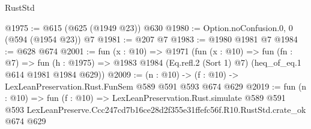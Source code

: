 \begin{lexlean}{RustStd}
\begin{coremodule}
@1975 := @615 (@625 (@1949 @23)) @630
@1980 := Option.noConfusion.{0, 0} (@594 (@1954 @23)) @7
@1981 := @207 @7
@1983 := @1980 @1981 @7
@1984 := @628 @674
@2001 := fun (x : @10) =>
  @1971
    (fun (x : @10) =>
    fun (fn : @7) =>
    fun (h : @1975) => @1983 @1984 (Eq.refl.{2} (Sort 1) @7) (heq_of_eq.{1} @614 @1981 @1984 @629))
@2009 := (n : @10) -> (f : @10) -> LexLeanPreservation.Rust.FunSem @589 @591 @593 @674 @629
@2019 := fun (n : @10) =>
  fun (f : @10) =>
  LexLeanPreservation.Rust.simulate
    @589
    @591
    @593
    LexLeanPreserve.Ccc247cd7b16ce28d2f355e31ffefc56f.R10.RustStd.crate_ok
    @674
    @629
\end{coremodule}
\end{lexlean}
